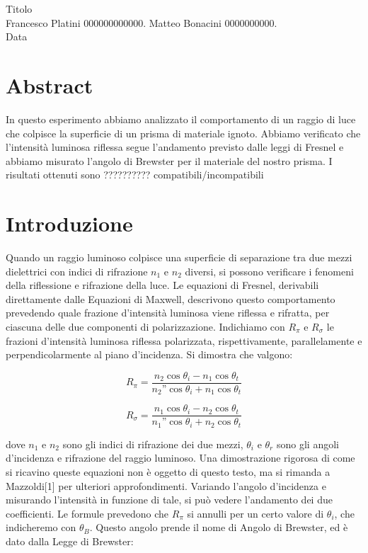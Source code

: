 \documentclass[12pt, a4paper, twoside]{article}
\begin{document}
\begin{center}
  \huge Titolo \\
  \large Francesco Platini 000000000000. Matteo Bonacini 0000000000.\\
  Data
\end{center}


\section{Abstract}\label{sec:abstract}
  In questo esperimento abbiamo analizzato il comportamento di un raggio di luce
  che colpisce la superficie di un prisma di materiale ignoto.
  Abbiamo verificato che l’intensità luminosa riflessa segue l’andamento
  previsto dalle leggi di Fresnel e abbiamo misurato l’angolo di Brewster per il
  materiale del nostro prisma.
  I risultati ottenuti sono ?????????? compatibili/incompatibili

\section{Introduzione}\label{sec:introduzione}
  Quando un raggio luminoso colpisce una superficie di separazione tra due mezzi
  dielettrici con indici di rifrazione $n_1$ e $n_2$ diversi, si possono verificare
  i fenomeni della riflessione e rifrazione della luce.
  Le equazioni di Fresnel, derivabili direttamente dalle Equazioni di Maxwell,
  descrivono questo comportamento prevedendo quale frazione d'intensità
  luminosa viene riflessa e rifratta, per ciascuna delle due componenti di
  polarizzazione.
  Indichiamo con $R_\pi$ e $R_\sigma$ le frazioni d'intensità luminosa riflessa
  polarizzata, rispettivamente, parallelamente e perpendicolarmente al piano
  d'incidenza.
  Si dimostra che valgono:

  \begin{equation}
    R_\pi = \frac {
      n_2 \cos{\theta_i} - n_1 \cos{\theta_t}
    } {
      n_2” \cos{\theta_i} + n_1 \cos{\theta_t}
    }\label{eq:fresnel equation 1}
  \end{equation}

  \begin{equation}
    R_\sigma = \frac {
      n_1 \cos{\theta_i} - n_2 \cos{\theta_t}
    } {
      n_1” \cos{\theta_i} + n_2 \cos{\theta_t}
    }\label{eq:fresnel equation 2}
  \end{equation}

  \noindent dove $n_1$ e $n_2$ sono gli indici di rifrazione dei due mezzi, $\theta_i$ e
  $\theta_r$ sono gli angoli d'incidenza e rifrazione del raggio luminoso.
  Una dimostrazione rigorosa di come si ricavino queste equazioni non è oggetto
  di questo testo, ma si rimanda a Mazzoldi[1] per ulteriori approfondimenti. %
  Variando l’angolo d'incidenza e misurando l’intensità in funzione di tale, si
  può vedere l’andamento dei due coefficienti.
  Le formule prevedono che $R_\pi$ si annulli per un certo valore di $\theta_i$,
  che indicheremo con $\theta_B$.
  Questo angolo prende il nome di Angolo di Brewster, ed è dato dalla Legge di Brewster:
\end{document}
